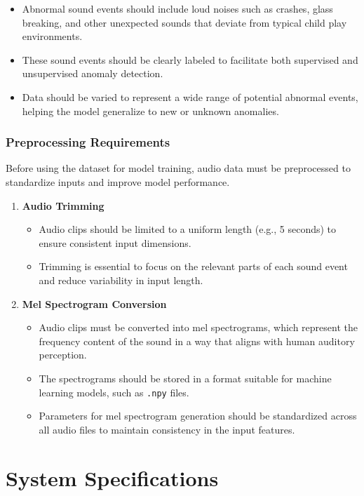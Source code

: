 \documentclass[conference]{IEEEtran}
\begin{document}
\begin{itemize}
    \item Abnormal sound events should include loud noises such as crashes, glass breaking, and other unexpected sounds that deviate from typical child play environments.
    \item These sound events should be clearly labeled to facilitate both supervised and unsupervised anomaly detection.
    \item Data should be varied to represent a wide range of potential abnormal events, helping the model generalize to new or unknown anomalies.
\end{itemize}

\subsubsection{Preprocessing Requirements}
Before using the dataset for model training, audio data must be preprocessed to standardize inputs and improve model performance.

\begin{enumerate}
    \item \textbf{Audio Trimming}
    \begin{itemize}
        \item Audio clips should be limited to a uniform length (e.g., 5 seconds) to ensure consistent input dimensions.
        \item Trimming is essential to focus on the relevant parts of each sound event and reduce variability in input length.
    \end{itemize}

    \item \textbf{Mel Spectrogram Conversion}
    \begin{itemize}
        \item Audio clips must be converted into mel spectrograms, which represent the frequency content of the sound in a way that aligns with human auditory perception.
        \item The spectrograms should be stored in a format suitable for machine learning models, such as \texttt{.npy} files.
        \item Parameters for mel spectrogram generation should be standardized across all audio files to maintain consistency in the input features.
    \end{itemize}
\end{enumerate}

\section{System Specifications}
\end{document}
